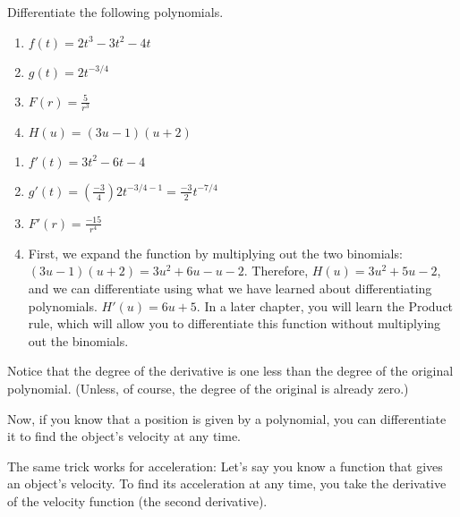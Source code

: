 \begin{Exercise}[title={Differentiation of polynomials}, label=diffpoly]
  Differentiate the following polynomials.
  \begin{enumerate}
  \item $f(t)=2t^3-3t^2-4t$
  \item $g(t)=2t^{-3/4}$
  \item $F(r) = \frac{5}{r^3}$
  \item $H(u) = (3u-1)(u+2)$
  \end{enumerate}
  \end{Exercise}
\begin{Answer}[ref=diffpoly]
\begin{enumerate}
\item $f'(t) = 3t^2-6t-4$
\item $g'(t) = (\frac{-3}{4})2t^{-3/4-1}=\frac{-3}{2}t^{-7/4}$
\item $F'(r) = \frac{-15}{r^4}$
\item First, we expand the function by multiplying out the two binomials: $(3u-1)(u+2)=3u^2+6u-u-2$. Therefore, $H(u) = 3u^2+5u-2$, and we can differentiate using what we have learned about differentiating polynomials. $H'(u) = 6u+5$. In a later chapter, you will learn the Product rule, which will allow you to differentiate this function without multiplying out the binomials. 
\end{enumerate}
\end{Answer}
Notice that the degree of the derivative is one less than the degree
of the original polynomial. (Unless, of course, the degree of the
original is already zero.)

Now, if you know that a position is given by a polynomial, you can
differentiate it to find the object's velocity at any time.

The same trick works for acceleration: Let's say you know a function
that gives an object's velocity. To find its acceleration at any time,
you take the derivative of the velocity function (the second derivative). 

